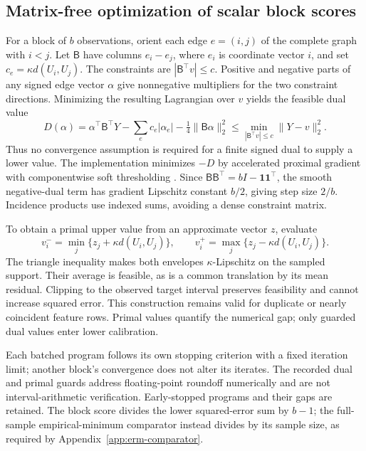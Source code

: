 \subsection{Matrix-free optimization of scalar block scores}
\label{app:block-solver}

For a block of $b$ observations, orient each edge $e=(i,j)$ of the complete
graph with $i<j$. Let $\mathsf B$ have columns $e_i-e_j$, where $e_i$ is
coordinate vector $i$, and set $c_e=\kappa d(U_i,U_j)$. The constraints are
$|\mathsf B^\top v|\leq c$. Positive and negative parts of any signed edge
vector $\alpha$ give nonnegative multipliers for the two constraint directions.
Minimizing the resulting Lagrangian over $v$ yields the feasible dual value
\[
 D(\alpha)=\alpha^\top\mathsf B^\top Y
       -\sum_e c_e|\alpha_e|-\tfrac14\|\mathsf B\alpha\|_2^2
       \leq \min_{|\mathsf B^\top v|\leq c}\|Y-v\|_2^2.
\]
Thus no convergence assumption is required for a finite signed dual to supply
a lower value. The implementation minimizes $-D$ by accelerated proximal
gradient with componentwise soft thresholding \citep{beck2009fista}. Since
$\mathsf B\mathsf B^\top=bI-\mathbf1\mathbf1^\top$, the smooth negative-dual
term has gradient Lipschitz constant $b/2$, giving step size $2/b$. Incidence
products use indexed sums, avoiding a dense constraint matrix.

To obtain a primal upper value from an approximate vector $z$, evaluate
\[
 v_i^- =\min_j\{z_j+\kappa d(U_i,U_j)\},\qquad
 v_i^+ =\max_j\{z_j-\kappa d(U_i,U_j)\}.
\]
The triangle inequality makes both envelopes $\kappa$-Lipschitz on the sampled
support. Their average is feasible, as is a common translation by its mean
residual. Clipping to the observed target interval preserves feasibility and
cannot increase squared error. This construction remains valid for duplicate
or nearly coincident feature rows. Primal values quantify the numerical gap;
only guarded dual values enter lower calibration.

Each batched program follows its own stopping criterion with a fixed iteration
limit; another block's convergence does not alter its iterates. The recorded
dual and primal guards address floating-point roundoff numerically and are
not interval-arithmetic verification. Early-stopped programs and their gaps
are retained. The block score divides the lower squared-error sum by $b-1$;
the full-sample empirical-minimum comparator instead divides by its sample
size, as required by Appendix~\ref{app:erm-comparator}.
